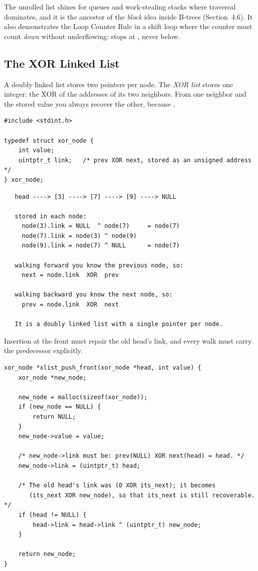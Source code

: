 The unrolled list shines for queues and work-stealing stacks where
traversal dominates, and it is the ancestor of the \emph{block} idea
inside B-trees (Section~4.6). It also demonstrates the Loop Counter
Rule in a shift loop where the counter must count \emph{down} without
underflowing:  stops at
, never below.

\subsection{The XOR Linked List}

A doubly linked list stores two pointers per node. The \emph{XOR
list} stores one integer: the XOR of the addresses of its two
neighbors. From one neighbor and the stored value you always recover
the other, because .

\begin{lstlisting}[caption={The XOR node: one integer, two neighbors recovered.}]
#include <stdint.h>

typedef struct xor_node {
    int value;
    uintptr_t link;   /* prev XOR next, stored as an unsigned address */
} xor_node;
\end{lstlisting}

\begin{verbatim}
   head ----> [3] ----> [7] ----> [9] ----> NULL

   stored in each node:
     node(3).link = NULL  ^ node(7)     = node(7)
     node(7).link = node(3) ^ node(9)
     node(9).link = node(7) ^ NULL      = node(7)

   walking forward you know the previous node, so:
     next = node.link  XOR  prev

   walking backward you know the next node, so:
     prev = node.link  XOR  next

   It is a doubly linked list with a single pointer per node.
\end{verbatim}

Insertion at the front must repair the old head's link, and every walk
must carry the predecessor explicitly.

\begin{lstlisting}[caption={Push at the front of an XOR list.}]
xor_node *xlist_push_front(xor_node *head, int value) {
    xor_node *new_node;

    new_node = malloc(sizeof(xor_node));
    if (new_node == NULL) {
        return NULL;
    }
    new_node->value = value;

    /* new_node->link must be: prev(NULL) XOR next(head) = head. */
    new_node->link = (uintptr_t) head;

    /* The old head's link was (0 XOR its_next); it becomes
       (its_next XOR new_node), so that its_next is still recoverable. */
    if (head != NULL) {
        head->link = head->link ^ (uintptr_t) new_node;
    }

    return new_node;
}
\end{lstlisting}

